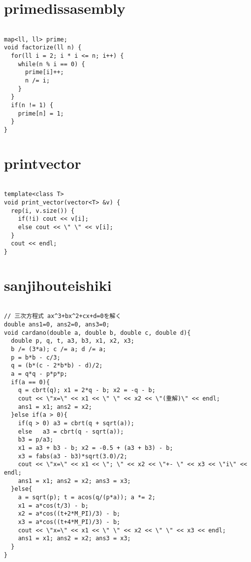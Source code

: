 \documentclass{jsarticle}
\begin{document}
\color{white}
\section{primedissasembly}
\color{black}
\begin{lstlisting}[caption=primedissasembly]

map<ll, ll> prime;
void factorize(ll n) {
  for(ll i = 2; i * i <= n; i++) {
    while(n % i == 0) {
      prime[i]++;
      n /= i;
    }
  }
  if(n != 1) {
    prime[n] = 1;
  }
}

\end{lstlisting}

\color{white}
\section{printvector}
\color{black}
\begin{lstlisting}[caption=printvector]

template<class T>
void print_vector(vector<T> &v) {
  rep(i, v.size()) {
    if(!i) cout << v[i];
    else cout << \" \" << v[i];
  }
  cout << endl;
}

\end{lstlisting}

\color{white}
\section{sanjihouteishiki}
\color{black}
\begin{lstlisting}[caption=sanjihouteishiki]

// 三次方程式 ax^3+bx^2+cx+d=0を解く 
double ans1=0, ans2=0, ans3=0;
void cardano(double a, double b, double c, double d){
  double p, q, t, a3, b3, x1, x2, x3;
  b /= (3*a); c /= a; d /= a;
  p = b*b - c/3;
  q = (b*(c - 2*b*b) - d)/2;
  a = q*q - p*p*p;
  if(a == 0){
    q = cbrt(q); x1 = 2*q - b; x2 = -q - b;
    cout << \"x=\" << x1 << \" \" << x2 << \"(重解)\" << endl;
    ans1 = x1; ans2 = x2;
  }else if(a > 0){
    if(q > 0) a3 = cbrt(q + sqrt(a));
    else   a3 = cbrt(q - sqrt(a));
    b3 = p/a3;
    x1 = a3 + b3 - b; x2 = -0.5 + (a3 + b3) - b;
    x3 = fabs(a3 - b3)*sqrt(3.0)/2;
    cout << \"x=\" << x1 << \"; \" << x2 << \"+- \" << x3 << \"i\" << endl;
    ans1 = x1; ans2 = x2; ans3 = x3;
  }else{
    a = sqrt(p); t = acos(q/(p*a)); a *= 2;
    x1 = a*cos(t/3) - b;
    x2 = a*cos((t+2*M_PI)/3) - b;
    x3 = a*cos((t+4*M_PI)/3) - b;
    cout << \"x=\" << x1 << \" \" << x2 << \" \" << x3 << endl;
    ans1 = x1; ans2 = x2; ans3 = x3;
  }
}

\end{lstlisting}
\end{document}
